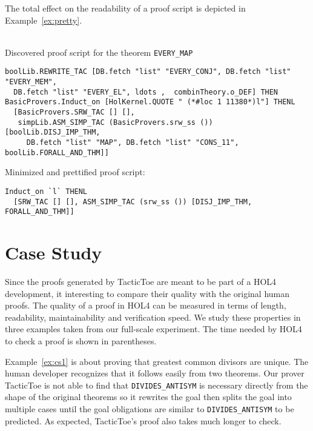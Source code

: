\documentclass[runningheads,a4paper,draft]{svjour3}
\def\holfour{\textsf{HOL4}\xspace}
\def\tactictoe{\textsf{TacticToe}\xspace}
\begin{document}
The total effect on the readability of a proof script is depicted in
Example~\ref{ex:pretty}.
\begin{example}\label{ex:pretty}\ \\
Discovered proof script for the theorem \texttt{EVERY\_MAP}
\begin{lstlisting}[language=SMLSmall]
boolLib.REWRITE_TAC [DB.fetch "list" "EVERY_CONJ", DB.fetch "list" "EVERY_MEM",
  DB.fetch "list" "EVERY_EL", ldots ,  combinTheory.o_DEF] THEN
BasicProvers.Induct_on [HolKernel.QUOTE " (*#loc 1 11380*)l"] THENL
  [BasicProvers.SRW_TAC [] [],
   simpLib.ASM_SIMP_TAC (BasicProvers.srw_ss ()) [boolLib.DISJ_IMP_THM,
     DB.fetch "list" "MAP", DB.fetch "list" "CONS_11", boolLib.FORALL_AND_THM]]

\end{lstlisting}
Minimized and prettified proof script:
\begin{lstlisting}[language=SMLSmall]
Induct_on `l` THENL
  [SRW_TAC [] [], ASM_SIMP_TAC (srw_ss ()) [DISJ_IMP_THM, FORALL_AND_THM]]
\end{lstlisting}
\end{example}

\section{Case Study}
Since the proofs generated by \tactictoe are meant to be part of a \holfour development, it interesting to compare their quality with the original human proofs.
The quality of a proof in \holfour can be measured in terms of length, readability, maintainability and verification speed.
We study these properties in three examples taken from our full-scale experiment.
The time needed by \holfour to check a proof is shown in parentheses.

Example~\ref{ex:cs1} is about proving that greatest common divisors are unique.
The human developer recognizes that it follows easily from two theorems.
Our prover \tactictoe is not able to find that \texttt{DIVIDES\_ANTISYM} is
necessary directly from the shape of the original theorems so it rewrites the
goal then splits the goal into multiple cases until the goal obligations are similar
to \texttt{DIVIDES\_ANTISYM} to be predicted. As expected, \tactictoe's proof
also takes much longer to check.
\end{document}
